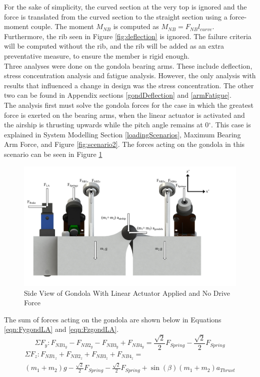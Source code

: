 \documentclass[../main.tex]{subfiles}
\begin{document}
For the sake of simplicity, the curved section at the very top is ignored and the force is translated from the curved section to the straight section using a force-moment couple. The moment $M_{NB}$ is computed as $M_{NB}=F_{NB}l_{curve}$. Furthermore, the rib seen in Figure \ref{fig:deflection} is ignored. The failure criteria will be computed without the rib, and the rib will be added as an extra preventative measure, to ensure the member is rigid enough.\\

Three analyses were done on the gondola bearing arms. These include deflection, stress concentration analysis and fatigue analysis. However, the only analysis with results that influenced a change in design was the stress concentration. The other two can be found in Appendix sections \ref{gondDeflection} and \ref{armFatigue}.\\

The analysis first must solve the gondola forces for the case in which the greatest force is exerted on the bearing arms, when the linear actuator is activated and the airship is thrusting upwards while the pitch angle remains at 0$^{\circ}$. This case is explained in System Modelling Section \ref{loadingScenarios}, Maximum Bearing Arm Force, and Figure \ref{fig:scenario2}. The forces acting on the gondola in this scenario can be seen in Figure \ref{fig:sideGondolaLA}
\begin{figure}[H]
	\centering
	\includegraphics[width=1.1\textwidth]{img/gondola/gondolaSideLA.pdf}
	\caption{Side View of Gondola With Linear Actuator Applied and No Drive Force}
	\label{fig:sideGondolaLA}
\end{figure}
 The sum of forces acting on the gondola are shown below in Equations \ref{eqn:FygondLA} and \ref{eqn:FzgondLA}. 
\begin{equation} \label{eqn:FygondLA}
\Sigma F_{y} : F_{NB1_{y}} - F_{NB2_{y}} - F_{NB3_{y}} + F_{NB4_{y}} = \frac{\sqrt{2}}{2} F_{Spring} -\frac{\sqrt{2}}{2} F_{Spring} 
\end{equation}
\begin{multline} \label{eqn:FzgondLA}
\Sigma F_{z} : F_{NB1_{z}} + F_{NB2_{z}} + F_{NB3_{z}} + F_{NB4_{z}} =\\ (m_{1} + m_2)g - \frac{\sqrt{2}}{2} F_{Spring} - \frac{\sqrt{2}}{2} F_{Spring} + \sin(\beta) (m_1+m_2) a_{Thrust}
\end{multline}
 
\end{document}
